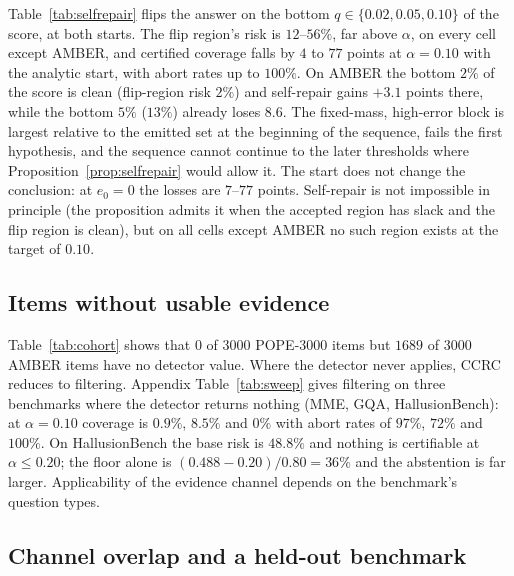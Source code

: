Table~\ref{tab:selfrepair} flips the answer on the bottom $q\in\{0.02,0.05,0.10\}$ of the score, at both starts. The
flip region's risk is $12$--$56\%$, far above $\alpha$, on every cell except AMBER, and certified coverage falls by $4$ to $77$ points at
$\alpha=0.10$ with the analytic start, with abort rates up to $100\%$. On AMBER the bottom $2\%$ of the score is clean (flip-region risk $2\%$) and
self-repair gains $+3.1$ points there, while the bottom $5\%$ ($13\%$) already loses $8.6$. The fixed-mass, high-error block is largest relative
to the emitted set at the beginning of the sequence, fails the first hypothesis, and the sequence cannot continue to the
later thresholds where Proposition~\ref{prop:selfrepair} would allow it. The start does not change the
conclusion: at $e_0=0$ the losses are $7$--$77$ points. Self-repair is not impossible in principle (the
proposition admits it when the accepted region has slack and the flip region is clean), but on all cells except AMBER no such region exists at the target of $0.10$.

\begin{table}[t]
\centering
\caption{Self-certified repair against filtering at $\alpha=0.10$: gain in points (abort rate, \%) and the risk of the
flip region $r_{\text{flip}}$ (\%), at both starts; the last column is CCRC with the $q=0.10$ detector gate.}
\label{tab:selfrepair}
\scriptsize
\resizebox{\textwidth}{!}{}
\end{table}

\subsection{Items without usable evidence}
\label{sec:noevidence}

Table~\ref{tab:cohort} shows that $0$ of $3000$ POPE-3000 items but $1689$ of $3000$ AMBER items have no detector value.
Where the detector never applies, CCRC reduces to filtering. Appendix Table~\ref{tab:sweep} gives filtering on three
benchmarks where the detector returns nothing (MME, GQA, HallusionBench): at $\alpha=0.10$ coverage is $0.9\%$, $8.5\%$
and $0\%$ with abort rates of $97\%$, $72\%$ and $100\%$. On HallusionBench the base risk is $48.8\%$ and nothing is
certifiable at $\alpha\le0.20$; the floor alone is $(0.488-0.20)/0.80=36\%$ and the abstention is far larger.
Applicability of the evidence channel depends on the benchmark's question types.



\subsection{Channel overlap and a held-out benchmark}
\label{sec:overlap}

